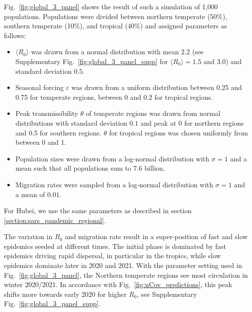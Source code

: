 \documentclass[rmp, reprint, superscriptaddress, floatfix,amsmath]{revtex4-1}
\newcommand{\forcing}{\varepsilon}
\begin{document}
Fig.~\ref{fig:global_3_panel} shows the result of such a simulation of 1,000 populations.
Populations were divided between northern temperate (50\%), southern temperate (10\%), and tropical (40\%) and assigned parameters as follows:
\begin{itemize}
    \item $\langle R_0 \rangle$ was drawn from a normal distribution with mean $2.2$ (see Supplementary Fig.~\ref{fig:global_3_panel_supp} for $\langle R_0 \rangle=1.5$ and 3.0) and standard deviation $0.5$.
    \item Seasonal forcing $\forcing$ was drawn from a uniform distribution between 0.25 and 0.75 for temperate regions, between 0 and 0.2 for tropical regions.
    \item Peak transmissibility $\theta$ of temperate regions was drawn from normal distributions with standard deviation $0.1$ and peak at $0$ for northern regions and 0.5 for southern regions. $\theta$ for tropical regions was chosen uniformly from between 0 and 1.  
    \item Population sizes were drawn from a log-normal distribution with $\sigma=1$ and a mean such that all populations sum to $7.6$ billion.
    \item Migration rates were sampled from a log-normal distribution with $\sigma=1$ and a mean of $0.01$.
\end{itemize}
For Hubei, we use the same parameters as described in section \ref{section:sars_pandemic_regional}.

The variation in $R_0$ and migration rate result in a super-position of fast and slow epidemics seeded at different times.
The initial phase is dominated by fast epidemics driving rapid dispersal, in particular in the tropics, while slow epidemics dominate later in 2020 and 2021.
With the parameter setting used in Fig.~\ref{fig:global_3_panel}, the Northern temperate regions see most circulation in winter 2020/2021. 
In accordance with Fig.~\ref{fig:nCov_predictions}, this peak shifts more towards early 2020 for higher $R_0$, see Supplementary Fig.~\ref{fig:global_3_panel_supp}.
\end{document}
